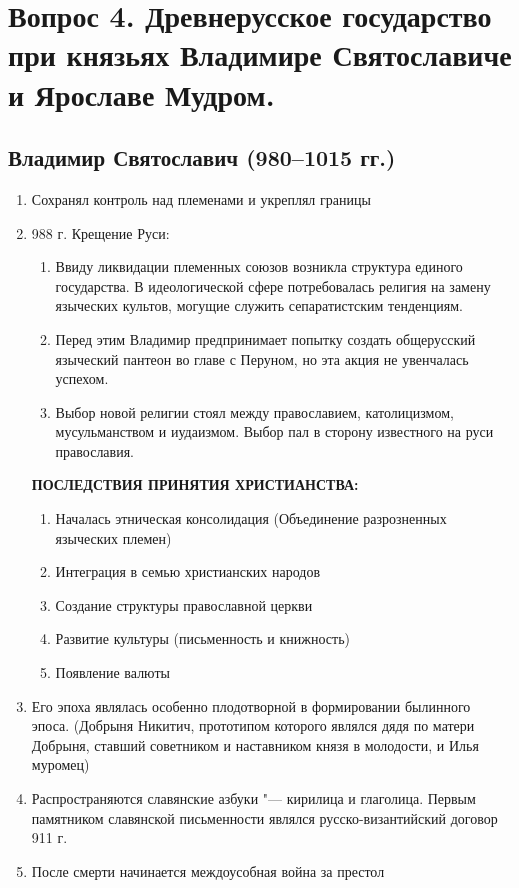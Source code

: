\section{Вопрос 4. Древнерусское государство при князьях Владимире Святославиче и Ярославе Мудром.}

\subsection{Владимир Святославич (980--1015 гг.)}

\begin{enumerate}
    \item{ Сохранял контроль над племенами и укреплял границы}
    \item{ 988 г. Крещение Руси:

        \begin{enumerate}
            \item{ Ввиду ликвидации племенных союзов возникла структура единого государства. В идеологической сфере потребовалась религия на замену языческих культов, могущие служить сепаратистским тенденциям.}
            \item{ Перед этим Владимир предпринимает попытку создать общерусский языческий пантеон во главе с Перуном, но эта акция не увенчалась успехом.}
            \item{ Выбор новой религии стоял между православием, католицизмом, мусульманством и иудаизмом. Выбор пал в сторону известного на руси православия.}
        \end{enumerate}

        \textbf{ПОСЛЕДСТВИЯ ПРИНЯТИЯ ХРИСТИАНСТВА:}

        \begin{enumerate}
            \item{ Началась этническая консолидация (Объединение разрозненных языческих племен)}
            \item{ Интеграция в семью христианских народов}
            \item{ Создание структуры православной церкви}
            \item{ Развитие культуры (письменность и книжность)}
            \item{ Появление валюты}
        \end{enumerate}
    }
    \item{ Его эпоха являлась особенно плодотворной в формировании былинного эпоса. (Добрыня Никитич, прототипом которого являлся дядя по матери Добрыня, ставший советником и наставником князя в молодости, и Илья муромец)}
    \item{ Распространяются славянские азбуки "--- кирилица и глаголица. Первым памятником славянской письменности являлся русско-византийский договор 911 г.}
    \item{ После смерти начинается междоусобная война за престол}
\end{enumerate}

